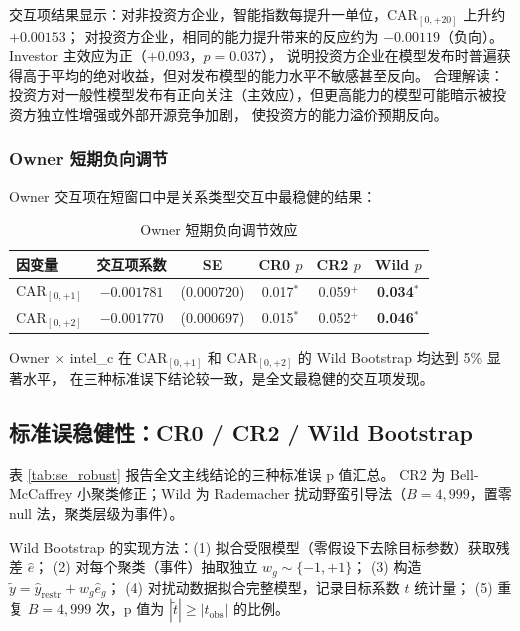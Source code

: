 \documentclass[11pt,fontset=fandol,a4paper]{ctexart}
\begin{document}
交互项结果显示：对非投资方企业，智能指数每提升一单位，$\text{CAR}_{[0,+20]}$ 上升约 $+0.00153$；
对投资方企业，相同的能力提升带来的反应约为 $-0.00119$（负向）。
Investor 主效应为正（$+0.093$，$p=0.037$），
说明投资方企业在模型发布时普遍获得高于平均的绝对收益，但对发布模型的能力水平不敏感甚至反向。
合理解读：投资方对一般性模型发布有正向关注（主效应），但更高能力的模型可能暗示被投资方独立性增强或外部开源竞争加剧，
使投资方的能力溢价预期反向。

\subsubsection{Owner 短期负向调节}

Owner 交互项在短窗口中是关系类型交互中最稳健的结果：

\begin{table}[htbp]
\centering
\caption{Owner 短期负向调节效应}
\label{tab:int_owner}
\small
\begin{tabular}{lccccc}
\toprule
因变量 & 交互项系数 & SE & CR0 $p$ & CR2 $p$ & Wild $p$ \\
\midrule
$\text{CAR}_{[0,+1]}$ & $-0.001781$ & (0.000720) & 0.017$^{*}$ & 0.059$^{+}$ & \textbf{0.034$^{*}$} \\
$\text{CAR}_{[0,+2]}$ & $-0.001770$ & (0.000697) & 0.015$^{*}$ & 0.052$^{+}$ & \textbf{0.046$^{*}$} \\
\bottomrule
\end{tabular}
\end{table}

Owner $\times$ intel\_c 在 $\text{CAR}_{[0,+1]}$ 和 $\text{CAR}_{[0,+2]}$ 的 Wild Bootstrap 均达到 5\% 显著水平，
在三种标准误下结论较一致，是全文最稳健的交互项发现。

\subsection{标准误稳健性：CR0 / CR2 / Wild Bootstrap}

表 \ref{tab:se_robust} 报告全文主线结论的三种标准误 p 值汇总。
CR2 为 Bell-McCaffrey 小聚类修正；Wild 为 Rademacher 扰动野蛮引导法（$B=4{,}999$，置零 null 法，聚类层级为事件）。

Wild Bootstrap 的实现方法：(1) 拟合受限模型（零假设下去除目标参数）获取残差 $\hat{e}$；
(2) 对每个聚类（事件）抽取独立 $w_g\sim\{-1,+1\}$；
(3) 构造 $\tilde{y}=\hat{y}_{\text{restr}}+w_g\hat{e}_g$；
(4) 对扰动数据拟合完整模型，记录目标系数 $t$ 统计量；
(5) 重复 $B=4{,}999$ 次，p 值为 $|\tilde{t}|\geq|t_{\text{obs}}|$ 的比例。
\end{document}
